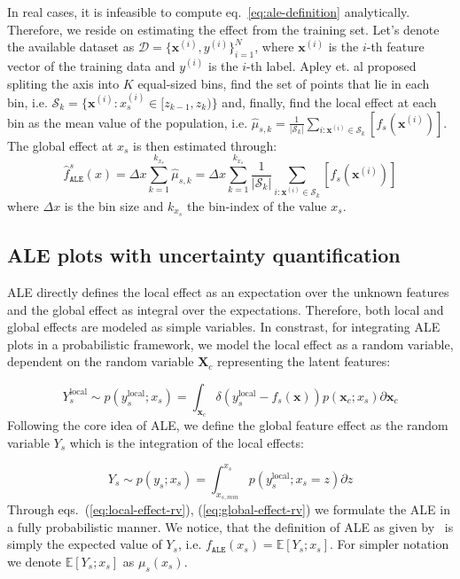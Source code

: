 \documentclass[wcp]{jmlr}
\newcommand{\xc}{\mathbf{x}_c}
\newcommand{\Xc}{\mathbf{X}_c}
\newcommand{\Ysloc}{Y_{s}^{\text{local}}}
\newcommand{\ysloc}{y_{s}^{\text{local}}}
\newcommand{\x}{\mathbf{x}}
\newcommand{\xii}{\mathbf{x}^{(i)}}
\newcommand{\yi}{y^{(i)}}
\newcommand{\E}{\mathbb{E}}
\newcommand{\1}{\mathbbm{1}}
\newcommand{\D}{\mathcal{D}}
\begin{document}
In real cases, it is infeasible to compute
eq.~\eqref{eq:ale-definition} analytically. Therefore, we reside on
estimating the effect from the training set. Let's denote the
available dataset as \(\D = \{\xii, \yi \}_{i=1}^N\), where \( \xii \)
is the \(i\)-th feature vector of the training data and \(\yi\) is the
\(i\)-th label. Apley et. al proposed spliting the axis into \( K \)
equal-sized bins, find the set of points that lie in each bin, i.e.
\( \mathcal{S}_k = \{ \xii : x_s^{(i)} \in [z_{k-1}, z_k) \} \) and,
finally, find the local effect at each bin as the mean value of the
population, i.e.
\(\hat{\mu}_{s,k} = \frac{1}{|\mathcal{S}_k|} \sum_{i:\xii \in
  \mathcal{S}_k} [f_s(\xii)]\). The global effect at \(x_s\) is then
estimated through:
%
\begin{equation}
  \label{eq:ale-approximation}
  \hat{f}_{\mathtt{ALE}}^s(x)
  = \Delta x \sum_{k=1}^{k_{x_s}} \hat{\mu}_{s,k}
  = \Delta x \sum_{k=1}^{k_{x_s}} \frac{1}{|\mathcal{S}_k|} \sum_{i:\xii \in \mathcal{S}_k} [f_s(\xii)]
\end{equation}
%
where \(\Delta x\) is the bin size and \(k_{x_s}\) the bin-index of the value \(x_s\).
%
%
\subsection{ALE plots with uncertainty quantification}

ALE directly defines the local effect as an expectation over the
unknown features and the global effect as integral over the
expectations. Therefore, both local and global effects are modeled as
simple variables. In constrast, for integrating ALE plots in a
probabilistic framework, we model the local effect as a random
variable, dependent on the random variable \(\Xc\) representing the
latent features:

\begin{equation}
    \Ysloc \sim p(\ysloc ; x_s)
    = \int_{\xc} \delta(\ysloc-f_s(\x)) p(\xc;x_s) \partial \xc
    \label{eq:local-effect-rv}
\end{equation}
%
Following the core idea of ALE, we define the global feature effect as
the random variable \(Y_s\) which is the integration of the local
effects:

\begin{equation}
  Y_s \sim p(y_s ; x_s) = \int_{x_{s,min}}^{x_s} p(\ysloc;x_s=z) \partial z
  \label{eq:global-effect-rv}
\end{equation}
%
Through eqs.~(\ref{eq:local-effect-rv}), (\ref{eq:global-effect-rv})
we formulate the ALE in a fully probabilistic manner. We notice, that
the definition of ALE as given by~\cite{Apley2020} is simply the
expected value of \(Y_s\), i.e.
\(f_{\mathtt{ALE}}(x_s) = \E[Y_s ; x_s]\). For simpler notation we
denote \(\E[Y_s ; x_s]\) as \(\mu_s (x_s)\).
\end{document}

